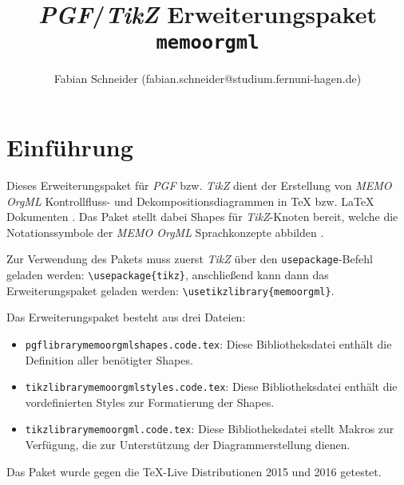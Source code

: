 \documentclass[12pt, a4paper]{article}
\begin{document}
\begin{titlepage}
\title{\textit{PGF}/\textit{TikZ} Erweiterungspaket \texttt{memoorgml}} 
\author{Fabian Schneider (fabian.schneider@studium.fernuni-hagen.de)}
\bigskip
\bigskip  
\end{titlepage}
\maketitle

\begin{figure}[htbp]
\end{figure}

\section{Einführung}
\label{sec:Einfuehrung}
Dieses Erweiterungspaket für \textit{PGF} bzw. \textit{TikZ} dient der Erstellung von \textit{MEMO OrgML} Kontrollfluss- und
Dekompositionsdiagrammen in \TeX{} bzw. \LaTeX{} Dokumenten \cite{Frank:MEMOOrgML2}.\newline
Das Paket stellt dabei Shapes für \textit{TikZ}-Knoten bereit, welche die Notationssymbole der \textit{MEMO OrgML} Sprachkonzepte abbilden \cite{Tantau:Tikz}.\medskip

\noindent Zur Verwendung des Pakets muss zuerst \textit{TikZ} über den \texttt{usepackage}-Befehl geladen werden: \lstinline|\usepackage{tikz}|, anschließend kann dann das Erweiterungspaket geladen werden: \lstinline|\usetikzlibrary{memoorgml}|.\medskip

\noindent Das Erweiterungspaket besteht aus drei Dateien:
\begin{itemize}
    \item {\texttt{pgflibrarymemoorgmlshapes.code.tex}: Diese Bibliotheksdatei enthält die Definition aller benötigter Shapes.}
    \item {\texttt{tikzlibrarymemoorgmlstyles.code.tex}: Diese Bibliotheksdatei enthält die vordefinierten Styles zur Formatierung der Shapes.}
    \item {\texttt{tikzlibrarymemoorgml.code.tex}: Diese Bibliotheksdatei stellt Makros zur Verfügung, die zur Unterstützung der Diagrammerstellung dienen.}
\end{itemize}
\noindent Das Paket wurde gegen die \TeX-Live Distributionen 2015 und 2016 getestet.\medskip
\newpage
\end{document}

